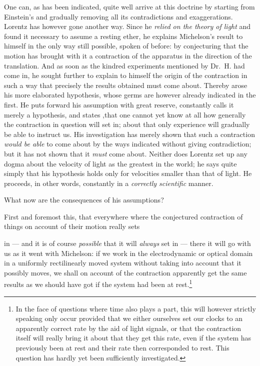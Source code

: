 \documentclass[12pt,a4paper]{article}
\begin{document}
One can, as has been indicated, quite well arrive at this doctrine by starting
from Einstein's and gradually removing all its contradictions and
exaggerations. Lorentz has however gone another way. Since he \emph{relied on
the theory of light} and found it necessary to assume a resting ether, he
explains Michelson's result to himself in the only way still possible, spoken
of before: by conjecturing that the motion has brought with it a contraction
of the apparatus in the direction of the translation. And as soon as the
kindred experiments mentioned by Dr.\ H. had come in, he sought further to
explain to himself the origin of the contraction in such a way that precisely
the results obtained must come about. Thereby arose his more elaborated
hypothesis, whose germs are however already indicated in the first. He puts
forward his assumption with great reserve, constantly calls it merely a
hypothesis, and states ,that one cannot yet know at all how generally the
contraction in question will set in; about that only experience will gradually
be able to instruct us. His investigation has merely shown that such a
contraction \emph{would be able} to come about by the ways indicated without
giving contradiction; but it has not shown that it \emph{must} come about.
Neither does Lorentz set up any dogma about the velocity of light as the
greatest in the world; he says quite simply that his hypothesis holds only for
velocities smaller than that of light. He proceeds, in other words, constantly
in a \emph{correctly scientific} manner.

What now are the consequences of his assumptions?

First and foremost this, that everywhere where the conjectured contraction of
things on account of their motion really sets

in --- and it is of course \emph{possible} that it will \emph{always} set in
--- there it will go with us as it went with Michelson: if we work in the
electrodynamic or optical domain in a uniformly rectilinearly moved system
without taking into account that it possibly moves, we shall on account of the
contraction apparently get the same results as we should have got if the
system had been at rest.\footnote{In the face of questions where time also
plays a part, this will however strictly speaking only occur provided that we
either ourselves set our clocks to an apparently correct rate by the aid of
light signals, or that the contraction itself will really bring it about that
they get this rate, even if the system has previously been at rest and their
rate then corresponded to rest. This question has hardly yet been
sufficiently investigated.}
\end{document}
